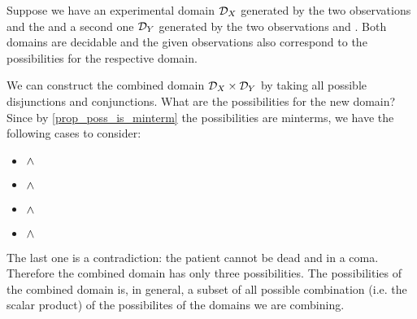 \documentclass[11pt,letterpaper,fleqn]{memoir} %
\begin{document}
Suppose we have an experimental domain $\mathcal{D}_X$ generated by the two observations  and the  and a second one $\mathcal{D}_Y$ generated by the two observations  and . Both domains are decidable and the given observations also correspond to the possibilities for the respective domain.

We can construct the combined domain $\mathcal{D}_X \times \mathcal{D}_Y$ by taking all possible disjunctions and conjunctions. What are the possibilities for the new domain? Since by \ref{prop_poss_is_minterm} the possibilities are minterms, we have the following cases to consider:
\begin{itemize}
	\item {} $\wedge$ 
	\item {} $\wedge$ 
	\item {} $\wedge$ 
	\item {} $\wedge$ 
\end{itemize}
The last one is a contradiction: the patient cannot be dead and in a coma. Therefore the combined domain has only three possibilities. The possibilities of the combined domain is, in general, a subset of all possible combination (i.e. the scalar product) of the possibilites of the domains we are combining.
\end{document}
